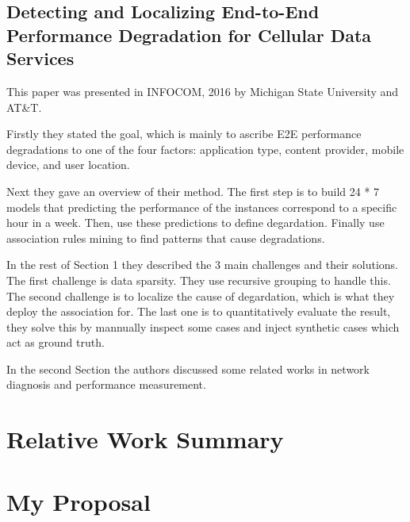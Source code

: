 \documentclass{manuscript}
\begin{document}
    \subsection{Detecting and Localizing End-to-End Performance Degradation for Cellular Data Services \cite{ahmed_detecting_2016}}

    This paper was presented in INFOCOM, 2016 by Michigan State University and AT\&T.

    Firstly they stated the goal, which is mainly to ascribe E2E performance degradations to one of the four factors:
    application type, content provider, mobile device, and user location.

    Next they gave an overview of their method. The first step is to build 24 * 7 models that predicting the performance
    of the instances correspond to a specific hour in a week. Then, use these predictions to define degardation. Finally
    use association rules mining to find patterns that cause degradations.

    In the rest of Section 1 they described the 3 main challenges and their solutions. The first challenge is data sparsity.
    They use recursive grouping to handle this. The second challenge is to localize the cause of degardation, which is
    what they deploy the association for. The last one is to quantitatively evaluate the result, they solve this by mannually
    inspect some cases and inject synthetic cases which act as ground truth.

    In the second Section the authors discussed some related works in network diagnosis and performance measurement.

    \section{Relative Work Summary}

    \section{My Proposal}

    
    
\end{document}
